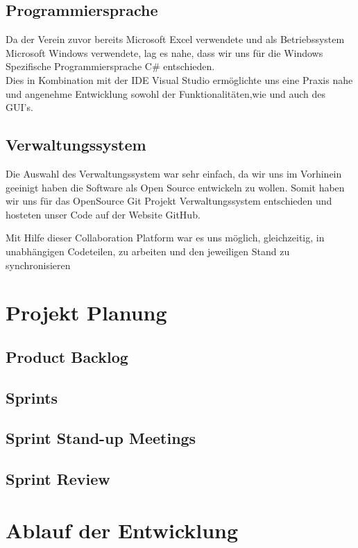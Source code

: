 \documentclass{article}
\begin{document}
\subsection{Programmiersprache}
Da der Verein zuvor bereits Microsoft Excel verwendete und als Betriebssystem Microsoft Windows verwendete, lag es nahe, dass wir uns für die Windows Spezifische Programmiersprache C\# entschieden. \\ Dies in Kombination mit der IDE Visual Studio ermöglichte uns eine Praxis nahe und angenehme Entwicklung sowohl der Funktionalitäten,wie und auch des GUI's. 

\subsection{Verwaltungssystem}
Die Auswahl des Verwaltungssystem war sehr einfach, da wir uns im Vorhinein geeinigt haben die Software als Open Source entwickeln zu wollen. Somit haben wir uns für das OpenSource Git Projekt Verwaltungssystem entschieden und hosteten unser Code auf der Website GitHub.

Mit Hilfe dieser Collaboration Platform war es uns möglich, gleichzeitig, in unabhängigen Codeteilen, zu arbeiten und den jeweiligen Stand zu synchronisieren

\newpage

\section{Projekt Planung}
\subsection{Product Backlog}
\subsection{Sprints}
\subsection{Sprint Stand-up Meetings}
\subsection{Sprint Review}

\newpage

\section{Ablauf der Entwicklung}
\end{document}
